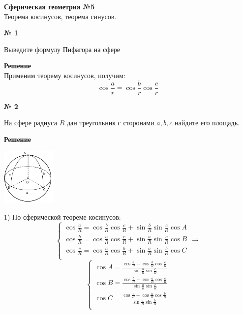 


    \begin{center}
        \textbf{Сферическая геометрия №5}\\
        Теорема косинусов, теорема синусов.
    \end{center}

    \begin{center}
        \textbf{№ 1}
    \end{center}

    Выведите формулу Пифагора на сфере

    \textbf{Решение}\\

    Применим теорему косинусов, получим:
    \[
        \cos \frac{a}{r} = \cos \frac{b}{r}\cos \frac{c}{r}
    \]

    \begin{center}
        \textbf{№ 2}
    \end{center}

    На сфере радиуса $R$ дан треугольник с сторонами $a, b, c$ найдите его площадь.

    \textbf{Решение}\\

    \begin{center}
        \includegraphics[width=0.2\textwidth]{images/img3}\\
    \end{center}

    1) По сферической теореме косинусов:
    \[
        \begin{cases}
            \cos \frac{a}{R} = \cos \frac{b}{R}\cos\frac{c}{R} + \sin \frac{b}{R}\sin\frac{c}{R}\cos A\\
            \cos \frac{b}{R} = \cos \frac{a}{R}\cos\frac{c}{R} + \sin \frac{a}{R}\sin\frac{c}{R}\cos B\\
            \cos \frac{c}{R} = \cos \frac{a}{R}\cos\frac{b}{R} + \sin \frac{a}{R}\sin\frac{b}{R}\cos C\\
        \end{cases}
        \rightarrow
    \]
    \[
        \begin{cases}
            \cos A = \frac{\cos \frac{a}{R} - \cos \frac{b}{R}\cos\frac{c}{R}}{\sin \frac{b}{R}\sin\frac{c}{R}}\\
            \cos B = \frac{\cos \frac{b}{R} - \cos \frac{a}{R}\cos\frac{c}{R}}{\sin \frac{a}{R}\sin\frac{c}{R}}\\
            \cos C = \frac{\cos \frac{c}{R} - \cos \frac{a}{R}\cos\frac{b}{R}}{\sin \frac{a}{R}\sin\frac{b}{R}}\\
        \end{cases}
    \]

